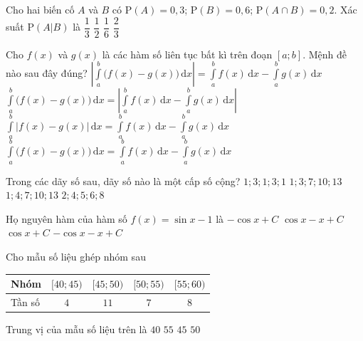 \begin{ex}
	Cho hai biến cố $A$ và $B$ có $\mathrm{P}(A)=0{,}3$; $\mathrm{P}(B)=0{,}6$; $\mathrm{P}(A\cap B)=0{,}2$. Xác suất $\mathrm{P}(A|B)$ là
	\choice
	{\True $\dfrac{1}{3}$}
	{$\dfrac{1}{2}$}
	{$\dfrac{1}{6}$}
	{$\dfrac{2}{3}$}
\end{ex}

\begin{ex}
	Cho $f(x)$ và $g(x)$ là các hàm số liên tục bất kì trên đoạn $[a;b]$. Mệnh đề nào sau đây đúng?
	\choice
	{$\left|\displaystyle\int \limits_{a}^{b}\big(f(x)-g(x)\big)\mathrm{\,d}x\right|=\displaystyle\int \limits_{a}^{b}f(x)\mathrm{\,d}x-\displaystyle\int \limits_{a}^{b}g(x)\mathrm{\,d}x$}
	{$\displaystyle\int \limits_{a}^{b}\big(f(x)-g(x)\big)\mathrm{\,d}x=\left|\displaystyle\int \limits_{a}^{b}f(x)\mathrm{\,d}x-\displaystyle\int \limits_{a}^{b}g(x)\mathrm{\,d}x\right|$}
	{$\displaystyle\int \limits_{a}^{b}\big|f(x)-g(x)\big|\mathrm{\,d}x=\displaystyle\int \limits_{a}^{b}f(x)\mathrm{\,d}x-\displaystyle\int \limits_{a}^{b}g(x)\mathrm{\,d}x$}
	{\True $\displaystyle\int \limits_{a}^{b}\big(f(x)-g(x)\big)\mathrm{\,d}x=\displaystyle\int \limits_{a}^{b}f(x)\mathrm{\,d}x-\displaystyle\int \limits_{a}^{b}g(x)\mathrm{\,d}x$}
\end{ex}

\begin{ex}
	Trong các dãy số sau, dãy số nào là một cấp số cộng?
	\choice
	{$1;3;1;3;1$}
	{$1;3;7;10;13$}
	{\True $1;4;7;10;13$}
	{$2;4;5;6;8$}
\end{ex}

\begin{ex}
	Họ nguyên hàm của hàm số $f(x)=\sin x-1$ là
	\choice
	{$-\cos x+C$}
	{$\cos x-x+C$}
	{$\cos x+C$}
	{\True $-\cos x-x+C$}
\end{ex}

\begin{ex}
	Cho mẫu số liệu ghép nhóm sau
	\begin{longtable}{|l|c|c|c|c|}
		\hline
		Nhóm&$[40;45)$&$[45;50)$&$[50;55)$&$[55;60)$\\
		\hline
		Tần số&$4$&$11$&$7$&$8$\\
		\hline
	\end{longtable}
	Trung vị của mẫu số liệu trên là
	\choice
	{$40$}
	{$55$}
	{$45$}
	{\True $50$}
\end{ex}

